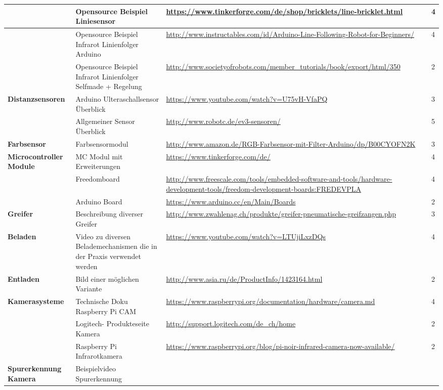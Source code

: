 \begin{tabular}{|p{3cm}|p{3.5cm}|p{5cm}|p{2cm}|}\hline
				 			&	Opensource Beispiel Liniesensor	&	\url{https://www.tinkerforge.com/de/shop/bricklets/line-bricklet.html}	&	4 \\\hline
 				 			&	Opensource Beispiel Infrarot Linienfolger Arduino	&	\url{http://www.instructables.com/id/Arduino-Line-Following-Robot-for-Beginners/}	&	4 \\\hline
 				 			&	Opensource Beispiel Infrarot Linienfolger Selfmade + Regelung	&	\url{http://www.societyofrobots.com/member_tutorials/book/export/html/350}	&	2 \\\hline
 \textbf{Distanzsensoren}	&	Arduino Ulteraschallsensor Überblick &	\url{https://www.youtube.com/watch?v=U75vH-VfaPQ}	&	3 \\\hline	
 							&	Allgemeiner Sensor Überblick &	\url{http://www.robotc.de/ev3-sensoren/}	&	5 \\\hline	


\textbf{Farbsensor}	&	Farbsensormodul	&	\url{http://www.amazon.de/RGB-Farbsensor-mit-Filter-Arduino/dp/B00CYOFN2K}	&	3 \\\hline			 		
\textbf{Microcontroller Module}	&	MC Modul mit Erweiterungen	&	\url{https://www.tinkerforge.com/de/}	&	4 \\\hline
					&	Freedomboard	&	\url{http://www.freescale.com/tools/embedded-software-and-tools/hardware-development-tools/freedom-development-boards:FREDEVPLA}	&	4 \\\hline
					&	Arduino Board &	\url{https://www.arduino.cc/en/Main/Boards}	&	2 \\\hline					
					
\textbf{Greifer}	& 	Beschreibung diverser Greifer & \url{http://www.zwahlenag.ch/produkte/greifer-pneumatische-greifzangen.php} & 3 \\\hline	
\textbf{Beladen}	& 	Video zu diversen Belademechanismen die in der Praxis verwendet werden & \url{https://www.youtube.com/watch?v=LTUjiLxzDQs} & 4 \\\hline
\textbf{Entladen}	& 	Bild einer möglichen Variante & \url{http://www.asia.ru/de/ProductInfo/1423164.html} & 2 \\\hline	
\textbf{Kamerasysteme} & Technische Doku Raspberry Pi CAM & \url{https://www.raspberrypi.org/documentation/hardware/camera.md} & 4 \\ \hline
                    & Logitech- Produkteseite Kamera  & \url{http://support.logitech.com/de_ch/home} & 2 \\ \hline
                    & Raspberry Pi Infrarotkamera & \url{https://www.raspberrypi.org/blog/pi-noir-infrared-camera-now-available/} & 2\\ \hline
\textbf{Spurerkennung Kamera} & Beispielvideo Spurerkennung & 
\end{tabular}\\